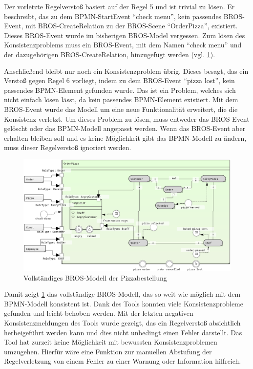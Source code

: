 Der vorletzte Regelverstoß basiert auf der Regel 5 und ist trivial zu lösen.
Er beschreibt, das zu dem BPMN-StartEvent ``check menu'', kein passendes BROS-Event, mit BROS-CreateRelation zu der BROS-Scene ``OrderPizza'', existiert.
Dieses BROS-Event wurde im bisherigen BROS-Model vergessen.
Zum lösen des Konsistenzproblems muss ein BROS-Event, mit dem Namen ``check menu'' und der dazugehörigen BROS-CreateRelation, hinzugefügt werden (vgl. \cref{fig:pizzaBros6}).

Anschließend bleibt nur noch ein Konsistenzproblem übrig.
Dieses besagt, das ein Verstoß gegen Regel 6 vorliegt, indem zu dem BROS-Event ``pizza lost'', kein passendes BPMN-Element gefunden wurde.
Das ist ein Problem, welches sich nicht einfach lösen lässt, da kein passendes BPMN-Element existiert.
Mit dem BROS-Event wurde das Modell um eine neue Funktionalität erweitert, die die Konsistenz verletzt.
Um dieses Problem zu lösen, muss entweder das BROS-Event gelöscht oder das BPMN-Modell angepasst werden.
Wenn das BROS-Event aber erhalten bleiben soll und es keine Möglichkeit gibt das BPMN-Modell zu ändern, muss dieser Regelverstoß ignoriert werden.

\begin{figure}
    \centering
    \includegraphics[width=\textwidth,keepaspectratio]{../images/example/bros-rule6.png}%
    \caption{Vollständiges BROS-Modell der Pizzabestellung}%
    \label{fig:pizzaBros6}
\end{figure}
\pagebreak
Damit zeigt \cref{fig:pizzaBros6} das vollständige BROS-Modell, das so weit wie möglich mit dem BPMN-Modell konsistent ist.
Dank des Tools konnten viele Konsistenzprobleme gefunden und leicht behoben werden.
Mit der letzten negativen Konsistenzmeldungen des Tools wurde gezeigt, das ein Regelverstoß absichtlich herbeigeführt werden kann und dies nicht unbedingt einen Fehler darstellt.
Das Tool hat zurzeit keine Möglichkeit mit bewussten Konsistenzproblemen umzugehen.
Hierfür wäre eine Funktion zur manuellen Abstufung der Regelverletzung von einem Fehler zu einer Warnung oder Information hilfreich.

